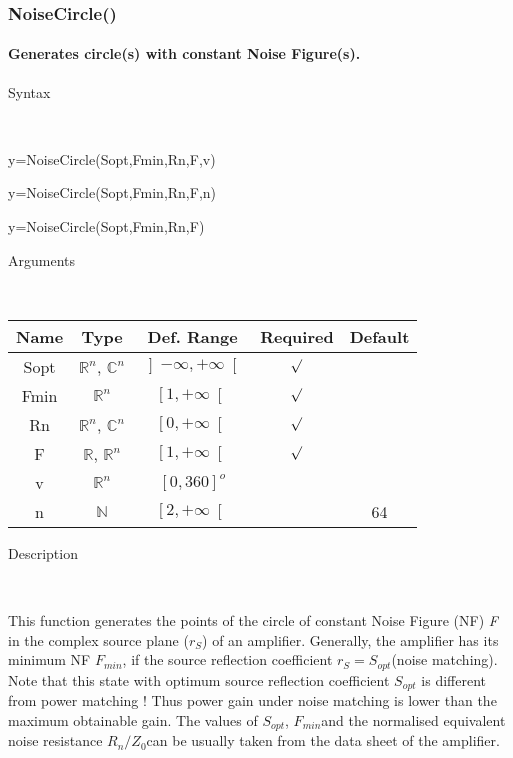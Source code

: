 \newpage
\subsubsection*{\hypertarget{NoiseCircle}{}{\Large NoiseCircle()}}


\paragraph{\label{par:NoiseCircle}Generates circle(s) with constant Noise Figure(s).}

\begin{description}
\item [Syntax]~
\end{description}
y=NoiseCircle(Sopt,Fmin,Rn,F,v)

\noindent y=NoiseCircle(Sopt,Fmin,Rn,F,n)

\noindent y=NoiseCircle(Sopt,Fmin,Rn,F)

\begin{description}
\item [Arguments]~
\end{description}
\begin{tabular}{|c|c|c|c|c|}
\hline 
Name&
Type&
Def. Range&
Required&
Default\tabularnewline
\hline
\hline 
Sopt&
$\mathbb{R}^{n}$, $\mathbb{C}^{n}$&
$\left]-\infty,+\infty\right[$&
$\surd$&
\tabularnewline
\hline
Fmin&
$\mathbb{R}^{n}$&
$\left[1,+\infty\right[$&
$\surd$&
\tabularnewline
\hline
Rn&
$\mathbb{R}^{n}$, $\mathbb{C}^{n}$&
$\left[0,+\infty\right[$&
$\surd$&
\tabularnewline
\hline
F&
$\mathbb{R}$, $\mathbb{R}^{n}$&
$\left[1,+\infty\right[$&
$\surd$&
\tabularnewline
\hline
v&
$\mathbb{R}^{n}$&
$\left[0,360\right]^{o}$&
&
\tabularnewline
\hline
n&
$\mathbb{N}$&
$\left[2,+\infty\right[$&
&
64\tabularnewline
\hline
\end{tabular}

\begin{description}
\item [Description]~
\end{description}
This function generates the points of the circle of constant Noise
Figure (NF) \textit{F} in the complex source plane ($r_{S}$) of an
amplifier. Generally, the amplifier has its minimum NF $F_{min}$,
if the source reflection coefficient $r_{S}=S_{opt}$(noise matching).
Note that this state with optimum source reflection coefficient $S_{opt}$
is different from power matching ! Thus power gain under noise matching
is lower than the maximum obtainable gain. The values of $S_{opt}$,
$F_{min}$and the normalised equivalent noise resistance $R_{n}/Z_{0}$can
be usually taken from the data sheet of the amplifier. 

